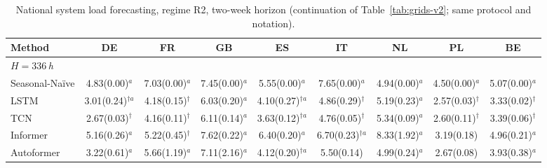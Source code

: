 \begin{table}[!t]
\centering
\caption{National system load forecasting, regime R2, two-week horizon (continuation of Table~\ref{tab:grids-v2}; same protocol and notation).}
\label{tab:grids-v2-b}
\setlength{\tabcolsep}{3pt}\footnotesize
\begin{adjustbox}{max width=\linewidth}
\begin{tabular}{lcccccccc}
\toprule
Method & DE & FR & GB & ES & IT & NL & PL & BE \\
\midrule
\multicolumn{9}{l}{\textit{$H=336$\,h}} \\
Seasonal-Na\"ive & 4.83{\scriptsize\color{gray}(0.00)}$^{a}$ & 7.03{\scriptsize\color{gray}(0.00)}$^{a}$ & 7.45{\scriptsize\color{gray}(0.00)}$^{a}$ & 5.55{\scriptsize\color{gray}(0.00)}$^{a}$ & 7.65{\scriptsize\color{gray}(0.00)}$^{a}$ & 4.94{\scriptsize\color{gray}(0.00)}$^{a}$ & 4.50{\scriptsize\color{gray}(0.00)}$^{a}$ & 5.07{\scriptsize\color{gray}(0.00)}$^{a}$ \\
LSTM & 3.01{\scriptsize\color{gray}(0.24)}$^{\dagger{}a}$ & 4.18{\scriptsize\color{gray}(0.15)}$^{\dagger{}}$ & 6.03{\scriptsize\color{gray}(0.20)}$^{a}$ & 4.10{\scriptsize\color{gray}(0.27)}$^{\dagger{}a}$ & 4.86{\scriptsize\color{gray}(0.29)}$^{\dagger{}}$ & 5.19{\scriptsize\color{gray}(0.23)}$^{a}$ & 2.57{\scriptsize\color{gray}(0.03)}$^{\dagger{}}$ & 3.33{\scriptsize\color{gray}(0.02)}$^{\dagger{}}$ \\
TCN & 2.67{\scriptsize\color{gray}(0.03)}$^{\dagger{}}$ & 4.16{\scriptsize\color{gray}(0.11)}$^{\dagger{}}$ & 6.11{\scriptsize\color{gray}(0.14)}$^{a}$ & 3.63{\scriptsize\color{gray}(0.12)}$^{\dagger{}a}$ & 4.76{\scriptsize\color{gray}(0.05)}$^{\dagger{}}$ & 5.34{\scriptsize\color{gray}(0.09)}$^{a}$ & 2.60{\scriptsize\color{gray}(0.11)}$^{\dagger{}}$ & 3.39{\scriptsize\color{gray}(0.06)}$^{\dagger{}}$ \\
Informer & 5.16{\scriptsize\color{gray}(0.26)}$^{a}$ & 5.22{\scriptsize\color{gray}(0.45)}$^{\dagger{}}$ & 7.62{\scriptsize\color{gray}(0.22)}$^{a}$ & 6.40{\scriptsize\color{gray}(0.20)}$^{a}$ & 6.70{\scriptsize\color{gray}(0.23)}$^{\dagger{}a}$ & 8.33{\scriptsize\color{gray}(1.92)}$^{a}$ & 3.19{\scriptsize\color{gray}(0.18)} & 4.96{\scriptsize\color{gray}(0.21)}$^{a}$ \\
Autoformer & 3.22{\scriptsize\color{gray}(0.61)}$^{a}$ & 5.66{\scriptsize\color{gray}(1.19)}$^{a}$ & 7.11{\scriptsize\color{gray}(2.16)}$^{a}$ & 4.12{\scriptsize\color{gray}(0.20)}$^{\dagger{}a}$ & 5.50{\scriptsize\color{gray}(0.14)} & 4.99{\scriptsize\color{gray}(0.24)}$^{a}$ & 2.67{\scriptsize\color{gray}(0.08)} & 3.93{\scriptsize\color{gray}(0.38)}$^{a}$ \\

\end{tabular}
\end{adjustbox}
\end{table}
